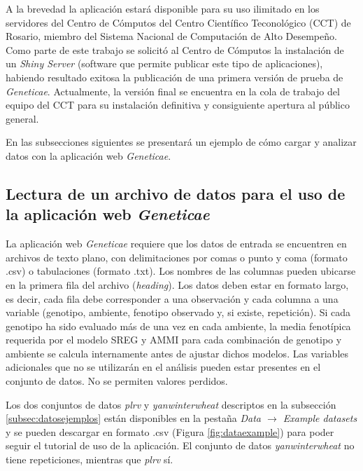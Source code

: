 A la brevedad la aplicación estará disponible para su uso ilimitado en los servidores del Centro de Cómputos del Centro Científico Teconológico (CCT) de Rosario, miembro del Sistema Nacional de Computación de Alto Desempeño. Como parte de este trabajo se solicitó al Centro de Cómputos la instalación de un \emph{Shiny Server}  (software que permite publicar este tipo de aplicaciones), habiendo resultado exitosa la publicación de una primera versión de prueba de \emph{Geneticae}. Actualmente, la versión final se encuentra en la cola de trabajo del equipo del CCT para su instalación definitiva y consiguiente apertura al público general.

En las subsecciones siguientes se presentará un ejemplo de cómo cargar y analizar datos con la aplicación web \emph{Geneticae}.

\subsection{Lectura de un archivo de datos para el uso de la aplicación web \emph{Geneticae}}

La aplicación web \emph{Geneticae} requiere que los datos de entrada se encuentren en archivos de texto plano, con delimitaciones por comas o punto y coma (formato .csv) o tabulaciones (formato .txt). Los nombres de las columnas pueden ubicarse en la primera fila del archivo (\emph{heading}). Los datos deben estar en formato largo, es decir, cada fila debe corresponder a una observación y cada columna a una variable (genotipo, ambiente, fenotipo observado y, si existe, repetición). Si cada genotipo ha sido evaluado más de una vez en cada ambiente, la media fenotípica requerida por el modelo SREG y AMMI para cada combinación de genotipo y ambiente se calcula internamente antes de ajustar dichos modelos. Las variables adicionales que no se utilizarán en el análisis pueden estar presentes en el conjunto de datos. No se permiten valores perdidos.

Los dos conjuntos de datos \emph{plrv} y \emph{yanwinterwheat} descriptos en la subsección \ref{subsec:datosejemplos} están disponibles en la pestaña \emph{Data $\rightarrow$ Example datasets} y se pueden descargar en formato .csv (Figura \ref{fig:dataexample}) para poder seguir el tutorial de uso de la aplicación. El conjunto de datos \emph{yanwinterwheat} no tiene repeticiones, mientras que \emph{plrv} sí. 

